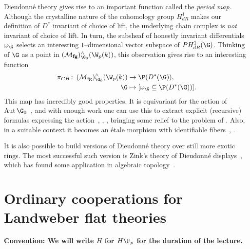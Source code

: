 \begin{remark}
Dieudonn\'e theory gives rise to an important function called the \textit{period map}.  Although the crystalline nature of the cohomology group $H^1_{dR}$ makes our definition of $D^*$ invariant of choice of lift, the underlying chain complex is \emph{not} invariant of choice of lift.  In turn, the subsheaf of honestly invariant differentials $\omega_{\G}$ selects an interesting $1$--dimensional vector subspace of $PH^1_{dR}(\G)$.  Thinking of $\G$ as a point in $(\moduli{fg})^\wedge_{\G_0}(\W_p(k))$, this observation gives rise to an interesting function
\begin{align*}
\pi_{GH}\co (\moduli{fg})^\wedge_{\G_0}(\W_p(k)) & \to \P(D^*(\G)), \\
\G & \mapsto [\omega_{\G} \subseteq \P(D^*(\G))].
\end{align*}
This map has incredibly good properties.  It is equivariant for the action of $\Aut \G_0$~\cite[Theorem 1]{HopkinsGrossAnnouncement}, and with enough work one can use this to extract explicit (recursive) formulas expressing the action~\cite{DevinatzHopkins}, \cite[Section 24]{StricklandFPFP}, \cite[Section 22]{HopkinsGrossEquivVBs}, bringing some relief to the problem of .  Also, in a suitable context it becomes an \'etale morphism with identifiable fibers~\cite[Theorem 1]{HopkinsGrossAnnouncement}, \cite[Sections 23-4]{HopkinsGrossEquivVBs}.
\end{remark}

\begin{remark}
It is also possible to build versions of Dieudonn\'e theory over still more exotic rings.  The most successful such version is Zink's theory of Dieudonn\'e displays~\cite{ZinkDisplays}, which has found some application in algebraic topology~\cite{LawsonDisplays}.
\end{remark}









\section{Ordinary cooperations for Landweber flat theories}\label{LEFTCooperations}

\begin{center}
\textbf{Convention: We will write $H$ for $H\F_p$ for the duration of the lecture.}
\end{center}

